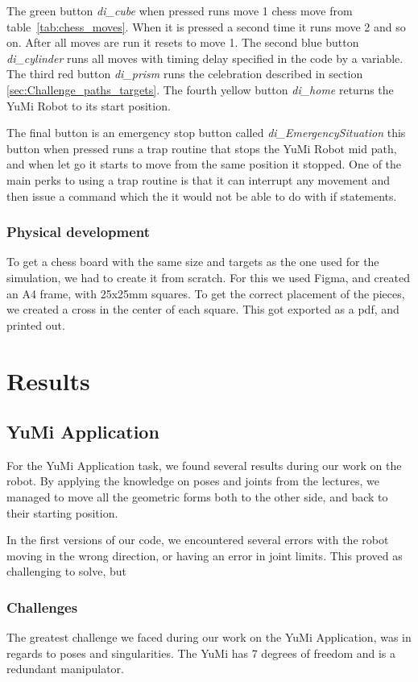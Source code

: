 \documentclass[a4paper,12pt]{article}
\begin{document}
The green button \textit{di\_cube} when pressed runs move 1 chess move from table~\ref{tab:chess_moves}. When it is pressed a second time it runs move 2 and so on. After all moves are run it resets to move 1. The second blue button \textit{di\_cylinder} runs all moves with timing delay specified in the code by a variable. The third red button \textit{di\_prism} runs the celebration described in section \ref{sec:Challenge_paths_targets}. The fourth yellow button \textit{di\_home} returns the YuMi Robot to its start position.

The final button is an emergency stop button called \textit{di\_EmergencySituation} this button when pressed runs a trap routine that stops the YuMi Robot mid path, and when let go it starts to move from the same position it stopped. One of the main perks to using a trap routine is that it can interrupt any movement and then issue a command which the it would not be able to do with if statements.

\subsubsection{Physical development}
To get a chess board with the same size and targets as the one used for the simulation, we had to create it from scratch. For this we used Figma, and created an A4 frame, with 25x25mm squares. To get the correct placement of the pieces, we created a cross in the center of each square. This got exported as a pdf, and printed out. 
\section{Results}
\subsection{YuMi Application}
For the YuMi Application task, we found several results during our work on the robot. By applying the knowledge on poses and joints from the lectures, we managed to move all the geometric forms both to the other side, and back to their starting position. 


In the first versions of our code, we encountered several errors with the robot moving in the wrong direction, or having an error in joint limits. This proved as challenging to solve, but 



\subsubsection{Challenges}
The greatest challenge we faced during our work on the YuMi Application, was in regards to poses and singularities. 
The YuMi has 7 degrees of freedom and is a redundant manipulator.
\end{document}
